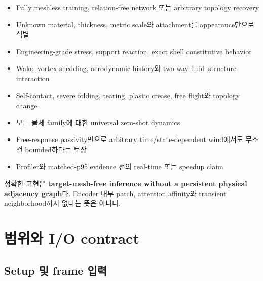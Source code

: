 \documentclass[11pt]{article}
\begin{document}
\begin{itemize}
  \item Fully meshless training, relation-free network 또는 arbitrary topology recovery
  \item Unknown material, thickness, metric scale와 attachment를 appearance만으로 식별
  \item Engineering-grade stress, support reaction, exact shell constitutive behavior
  \item Wake, vortex shedding, aerodynamic history와 two-way fluid--structure interaction
  \item Self-contact, severe folding, tearing, plastic crease, free flight와 topology change
  \item 모든 물체 family에 대한 universal zero-shot dynamics
  \item Free-response passivity만으로 arbitrary time/state-dependent wind에서도 무조건 bounded하다는 보장
  \item Profiler와 matched-p95 evidence 전의 real-time 또는 speedup claim
\end{itemize}

정확한 표현은 \textbf{target-mesh-free inference without a persistent physical adjacency graph}다.
Encoder 내부 patch, attention affinity와 transient neighborhood까지 없다는 뜻은 아니다.

\section{범위와 I/O contract}

\subsection{Setup 및 frame 입력}
\end{document}
